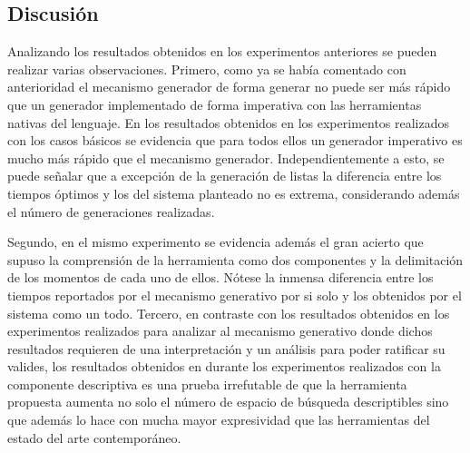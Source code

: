 \subsection*{Discusión}

Analizando los resultados obtenidos en los experimentos anteriores se pueden realizar varias observaciones.
Primero, como ya se había comentado con anterioridad el mecanismo generador de forma generar no puede ser más
rápido que un generador implementado de forma imperativa con las herramientas nativas del lenguaje. En los
resultados obtenidos en los experimentos realizados con los casos básicos se evidencia que para todos ellos un generador
imperativo es mucho más rápido que el mecanismo generador. Independientemente a esto, se puede señalar que a
excepción de la generación de listas la diferencia entre los tiempos óptimos y los del sistema planteado no es
extrema, considerando además el número de generaciones realizadas.

Segundo, en el mismo experimento se evidencia además el gran acierto que supuso la comprensión de la herramienta
como dos componentes y la delimitación de los momentos de cada uno de ellos. Nótese la inmensa diferencia entre
los tiempos reportados por el mecanismo generativo por si solo y los obtenidos por el sistema como un todo. Tercero,
en contraste con los resultados obtenidos en los experimentos realizados para analizar al mecanismo generativo donde
dichos resultados requieren de una interpretación y un análisis para poder ratificar su valides, los resultados
obtenidos en durante los experimentos realizados con la componente descriptiva es una prueba irrefutable de que la
herramienta propuesta aumenta no solo el número de espacio de búsqueda descriptibles sino que además lo hace con
mucha mayor expresividad que las herramientas del estado del arte contemporáneo.

